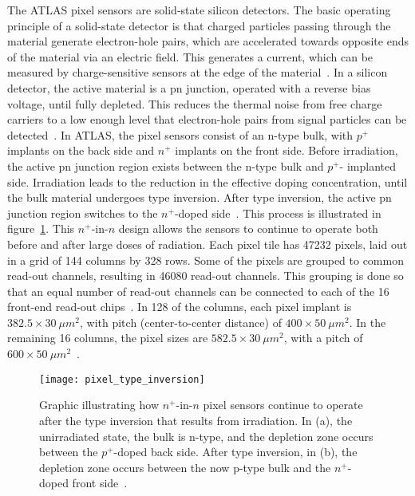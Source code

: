 The ATLAS pixel sensors are solid-state silicon detectors.
The basic operating principle of a solid-state detector is that charged particles passing through the material generate electron-hole pairs, which are accelerated towards opposite ends of the material via an electric field.
This generates a current, which can be measured by charge-sensitive sensors at the edge of the material~\cite{spieler-2005}.
In a silicon detector, the active material is a pn junction, operated with a reverse bias voltage, until fully depleted.
This reduces the thermal noise from free charge carriers to a low enough level that electron-hole pairs from signal particles can be detected~\cite{spieler-2005}.
In ATLAS, the pixel sensors consist of an n-type bulk, with $p^+$ implants on the back side and $n^+$ implants on the front side.
Before irradiation, the active pn junction region exists between the n-type bulk and $p^+$- implanted side.
Irradiation leads to the reduction in the effective doping concentration, until the bulk material undergoes type inversion.
After type inversion, the active pn junction region switches to the $n^+$-doped side~\cite{pixels-2008}.
This process is illustrated in figure~\ref{fig:pixel_type_inversion}.
This $n^+$-in-$n$ design allows the sensors to continue to operate both before and after large doses of radiation.
Each pixel tile has 47232 pixels, laid out in a grid of 144 columns by 328 rows.
Some of the pixels are grouped to common read-out channels, resulting in 46080 read-out channels.
This grouping is done so that an equal number of read-out channels can be connected to each of the 16 front-end read-out chips~\cite{pixels-2008}.
In 128 of the columns, each pixel implant is $382.5\times30~\mu m^2$, with pitch (center-to-center distance) of  $400\times50~\mu m^2$.
In the remaining 16 columns, the pixel sizes are $582.5\times30~\mu m^2$, with a pitch of  $600\times50~\mu m^2$~\cite{pixels-2008}.

\begin{figure}[!ht]\centering
\texttt{[image: pixel\_type\_inversion]}
\caption{Graphic illustrating how $n^+$-in-$n$ pixel sensors continue to operate after the type inversion that results from irradiation.
In (a), the unirradiated state, the bulk is n-type, and the depletion zone occurs between the $p^+$-doped back side.
After type inversion, in (b), the depletion zone occurs between the now p-type bulk and the $n^+$-doped front side~\cite{pixels-2008}.}
\label{fig:pixel_type_inversion}
\end{figure}

